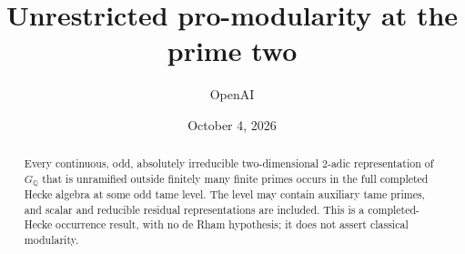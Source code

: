 \documentclass[11pt]{article}
\title{Unrestricted pro-modularity at the prime two}
\author{OpenAI}
\date{October 4, 2026}
\theoremstyle{definition}
\theoremstyle{remark}
\newcommand{\Q}{\mathbb Q}
\begin{document}
\maketitle
\begin{abstract}
Every continuous, odd, absolutely irreducible two-dimensional
$2$-adic representation of $G_{\Q}$ that is unramified outside finitely
many finite primes occurs in the full completed Hecke algebra at some
odd tame level. The level may contain auxiliary tame primes, and scalar
and reducible residual representations are included. This is a
completed-Hecke occurrence result, with no de Rham hypothesis; it does
not assert classical modularity.
\end{abstract}










\end{document}
